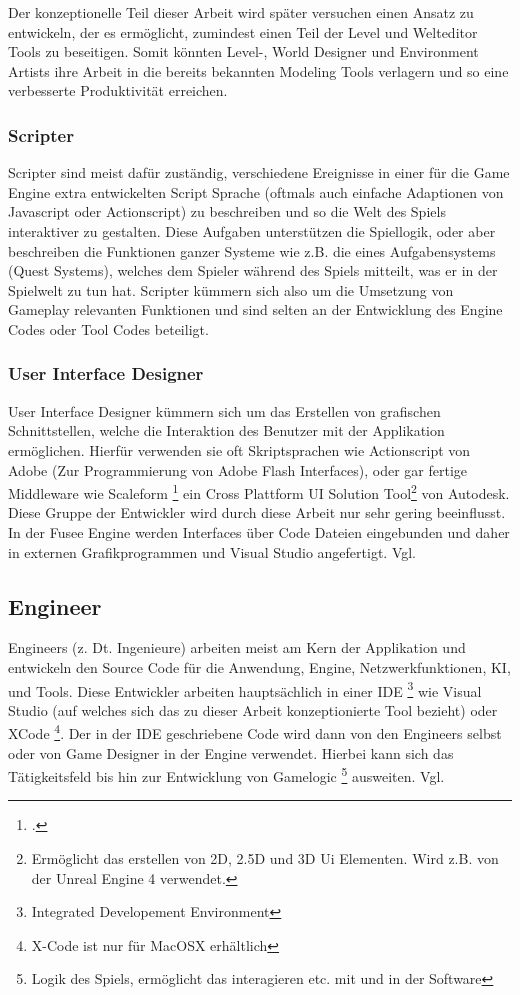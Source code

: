 \documentclass[pagesize, paper=a4, fontsize=12pt, titlepage=true, headings=small, headnosepline, abstractoff, liststotoc, nochapterprefix, plainheadsepline, twoside]{scrreprt}
\begin{document}
Der konzeptionelle Teil dieser Arbeit wird später versuchen einen Ansatz zu entwickeln, der es ermöglicht, zumindest einen Teil der Level und Welteditor Tools zu beseitigen. Somit könnten Level-, World Designer und Environment Artists ihre Arbeit in die bereits bekannten Modeling Tools verlagern und so eine verbesserte Produktivität erreichen.

\subsubsection{Scripter}
Scripter sind meist dafür zuständig, verschiedene Ereignisse in einer für die Game Engine extra entwickelten Script Sprache (oftmals auch einfache Adaptionen von Javascript oder Actionscript) zu beschreiben und so die Welt des Spiels interaktiver zu gestalten. Diese Aufgaben unterstützen die Spiellogik, oder aber beschreiben die Funktionen ganzer Systeme wie z.B. die eines Aufgabensystems (Quest Systems), welches dem Spieler während des Spiels mitteilt, was er in der Spielwelt zu tun hat. Scripter kümmern sich also um die Umsetzung von Gameplay relevanten Funktionen und sind selten an der Entwicklung des Engine Codes oder Tool Codes beteiligt.

\subsubsection{User Interface Designer}
User Interface Designer kümmern sich um das Erstellen von grafischen Schnittstellen, welche die Interaktion des Benutzer mit der Applikation ermöglichen. Hierfür verwenden sie oft Skriptsprachen wie Actionscript von Adobe (Zur Programmierung von Adobe Flash Interfaces), oder gar fertige Middleware wie Scaleform \footcite{AutodeskScale2014} ein Cross Plattform UI Solution Tool\footnote{Ermöglicht das erstellen von 2D, 2.5D und 3D Ui Elementen. Wird z.B. von der Unreal Engine 4 verwendet.} von Autodesk. Diese Gruppe der Entwickler wird durch diese Arbeit nur sehr gering beeinflusst. In der Fusee Engine werden Interfaces über Code Dateien eingebunden und daher in externen Grafikprogrammen und Visual Studio angefertigt. Vgl. \parencite[S. 31]{Chandler2006}

\subsection{Engineer}
Engineers (z. Dt. Ingenieure) arbeiten meist am Kern der Applikation und entwickeln den Source Code für die Anwendung, Engine, Netzwerkfunktionen, KI, und Tools. Diese Entwickler arbeiten hauptsächlich in einer IDE \footnote{Integrated Developement Environment} wie Visual Studio (auf welches sich das zu dieser Arbeit konzeptionierte Tool bezieht) oder XCode \footnote{X-Code ist nur für MacOSX erhältlich}. Der in der IDE geschriebene Code wird dann von den Engineers selbst oder von Game Designer in der Engine verwendet. Hierbei kann sich das Tätigkeitsfeld bis hin zur Entwicklung von Gamelogic \footnote{Logik des Spiels, ermöglicht das interagieren etc. mit und in der Software} ausweiten. Vgl. \parencite[S. 26]{Chandler2006}
\end{document}
